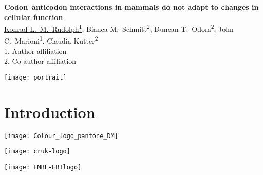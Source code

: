 \documentclass[a0,portrait]{a0poster}
\begin{document}
\sffamily

\noindent
\begin{minipage}[][8cm][t]{0.88\textwidth}
    {
        \VeryHuge\color{EMBLBlue}\bfseries\sffamily%
        Codon–anticodon interactions in mammals do not adapt to changes in
        cellular function
    }
    {
        \\[\baselineskip]
        \noindent
        \Large\color{Black}%
        \underline{Konrad L.\ M.\ Rudolph\textsuperscript{1}},
        Bianca M.\ Schmitt\textsuperscript{2},
        Duncan T.\ Odom\textsuperscript{2},
        John C.\ Marioni\textsuperscript{1},
        Claudia Kutter\textsuperscript{2}
    }
    \\[0.5cm]
    \normalsize%
    1. Author affiliation\\
    2. Co-author affiliation
\end{minipage}%
\hfill%
\begin{minipage}[][8cm][t]{0.1\textwidth}
    \raggedleft
    \texttt{[image: portrait]}
\end{minipage}

\vspace{5cm}
\Large

\noindent
\begin{minipage}[t]{0.45\textwidth}
    \section*{Introduction}
    \blindtext
\end{minipage}

\small
\begin{multicols}{2}
    
\end{multicols}

\vfill

\begin{minipage}[][][b]{0.3\textwidth}
    \centering
    \texttt{[image: Colour\_logo\_pantone\_DM]}
\end{minipage}%
\hfill%
\begin{minipage}[][][b]{0.3\textwidth}
    \centering
    \texttt{[image: cruk-logo]}
\end{minipage}%
\hfill%
\begin{minipage}[][][b]{0.3\textwidth}
    \centering
    \texttt{[image: EMBL-EBIlogo]}
\end{minipage}%
\end{document}
